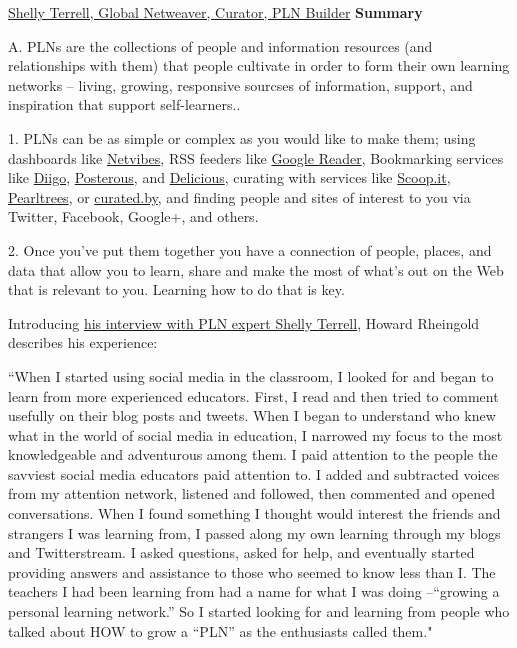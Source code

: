 \href{http://player.vimeo.com/video/15880455}{Shelly Terrell, Global
Netweaver, Curator, PLN Builder} \textbf{} \textbf{Summary}

A. PLNs are the collections of people and information resources (and
relationships with them) that people cultivate in order to form their
own learning networks -- living, growing, responsive sourcses of
information, support, and inspiration that support self-learners..

1. PLNs can be as simple or complex as you would like to make them;
using dashboards like \href{http://www.netvibes.com/en}{Netvibes}, RSS
feeders like \href{http://www.google.com/reader}{Google Reader},
Bookmarking services like \href{http://www.diigo.com/}{Diigo},
\href{https://posterous.com/}{Posterous}, and
\href{http://delicious.com/}{Delicious}, curating with services like
\href{http://www.scoop.it/}{Scoop.it},
\href{http://www.pearltrees.com/}{Pearltrees}, or
\href{http://www.curated.by/}{curated.by}, and finding people and sites
of interest to you via Twitter, Facebook, Google+, and others.

2. Once you've put them together you have a connection of people,
places, and data that allow you to learn, share and make the most of
what's out on the Web that is relevant to you. Learning how to do that
is key.

Introducing
\href{http://dmlcentral.net/blog/howard-rheingold/shelly-terrell-global-netweaver-curator-pln-builder}{his
interview with PLN expert Shelly Terrell}, Howard Rheingold describes
his experience:

``When I started using social media in the classroom, I looked for and
began to learn from more experienced educators. First, I read and then
tried to comment usefully on their blog posts and tweets. When I began
to understand who knew what in the world of social media in education, I
narrowed my focus to the most knowledgeable and adventurous among them.
I paid attention to the people the savviest social media educators paid
attention to. I added and subtracted voices from my attention network,
listened and followed, then commented and opened conversations. When I
found something I thought would interest the friends and strangers I was
learning from, I passed along my own learning through my blogs and
Twitterstream. I asked questions, asked for help, and eventually started
providing answers and assistance to those who seemed to know less than
I. The teachers I had been learning from had a name for what I was doing
--``growing a personal learning network.'' So I started looking for and
learning from people who talked about HOW to grow a ``PLN'' as the
enthusiasts called them."

